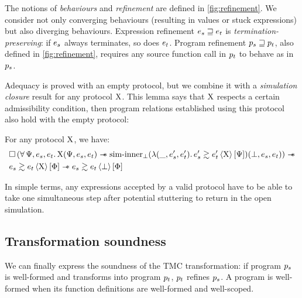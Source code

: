 The notions of \emph{behaviours} and \emph{refinement} are defined in \cref{fig:refinement}.
We consider not only converging behaviours (resulting in values or stuck expressions) but also diverging behaviours.
Expression refinement $\datalangExpr_s \refined \datalangExpr_t$ is \emph{termination-preserving}: if $\datalangExpr_s$ always terminates, so does $\datalangExpr_t$.
Program refinement $\datalangProg_s \refined \datalangProg_t$, also defined in \cref{fig:refinement}, requires any source function call in $\datalangProg_t$ to behave as in $\datalangProg_s$.

Adequacy is proved with an empty protocol, but we combine it with a \emph{simulation closure} result for any protocol $\mathrm{X}$. This lemma says that $\mathrm{X}$ respects a certain admissibility condition, then program relations established using this protocol also hold with the empty protocol:
\begin{lemma}
\label{lem:closure}
  For any protocol $\mathrm{X}$, we have:
    \begin{align*}
            &
            \iPersistent \left(
                \forall \iPredTwo, \datalangExpr_s, \datalangExpr_t \ldotp
                \iProt (\iPredTwo, \datalangExpr_s, \datalangExpr_t) \iWand
                \mathrm{sim \mathhyphen inner}_\bot (\lambdaAbs (\_, \datalangExpr_s', \datalangExpr_t') \ldotp \iSim[\iProt]{\iPredTwo}{\datalangExpr_s'}{\datalangExpr_t'}) (\bot, \datalangExpr_s, \datalangExpr_t)
            \right) \iWand
        \\
            &
            \iSim[\iProt]{\iPred}{\datalangExpr_s}{\datalangExpr_t} \iWand
            \iSim[\bot]{\iPred}{\datalangExpr_s}{\datalangExpr_t}
    \end{align*}
\end{lemma}

In simple terms, any expressions accepted by a valid protocol have to be able to take one simultaneous step after potential stuttering to return in the open simulation.

\subsection{Transformation soundness}

We can finally express the soundness of the TMC transformation: if program $\datalangProg_s$ is well-formed and transforms into program $\datalangProg_t$, $\datalangProg_t$ refines $\datalangProg_s$.
A program is well-formed when its function definitions are well-formed and well-scoped.

